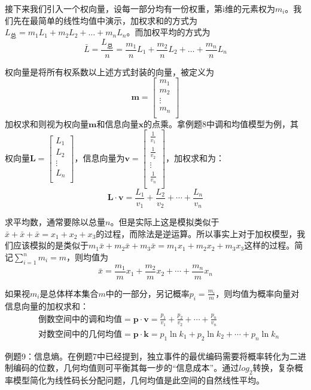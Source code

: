 \documentclass[fontset=none]{ctexart}
\begin{document}
接下来我们引入一个权向量，设每一部分均有一份权重，第i维的元素权为$m_i$。我们先在最简单的线性均值中演示，加权求和的方式为$L_\text{总}=m_1L_1+m_2L_2+\dots +m_nL_n$。而加权平均的方式为$$\bar{L}=\frac{L_\text{总}}{n} = \frac{m_1}{n}L_1+\frac{m_2}{n}L_2+\dots+\frac{m_n}{n}L_n$$

权向量是将所有权系数以上述方式封装的向量，被定义为
$$
\boldsymbol{m}=\left[ \begin{array}{c}
	m_1\\
	m_2\\
	\vdots\\
	m_n\\
\end{array} \right]
$$ 加权求和则视为权向量$\boldsymbol{m}$和信息向量$\boldsymbol{x}$的点乘。拿例题8中调和均值模型为例，其权向量$\boldsymbol{L}=
\left[ \begin{array}{c}
	L_1\\
	L_2\\
	\vdots\\
	L_n\\
\end{array} \right]
$，信息向量为$\boldsymbol{v}
=\left[ \begin{array}{c}
	\frac{1}{v_1}\\
	\frac{1}{v_2}\\
	\vdots\\
	\frac{1}{v_n}\\
\end{array} \right]
$，加权求和为：$$\boldsymbol{L}\cdot \boldsymbol{v}=\frac{L_1}{v_1}+\frac{L_2}{v_2}+\cdots +\frac{L_n}{v_n}$$

求平均数，通常要除以总量$n$。但是实际上这是模拟类似于$\bar{x}+\bar{x}+\bar{x} = x_1 + x_2 + x_3$的过程，而除法是逆运算。所以事实上对于加权模型，我们应该模拟的是类似于$m_1\bar{x}+m_2\bar{x}+m_3\bar{x} = m_1x_1 + m_2x_2 + m_3x_3$这样的过程。简记$\sum_{i=1}^n{m_i}= m$，则均值为$$\bar{x}=\frac{m_1}{m}x_1+\frac{m_2}{m}x_2+\cdots +\frac{m_n}{m}x_n$$

如果视$m_i$是总体样本集合$m$中的一部分，另记概率$p_i=\frac{m_i}{m}$，则均值为概率向量对信息向量的加权求和：
\begin{align}
  &\text{倒数空间中的调和均值}=\boldsymbol{p}\cdot \boldsymbol{v}=\frac{p_1}{v_1}+\frac{p_2}{v_2}+\cdots +\frac{p_n}{v_n} \\
  &\text{对数空间中的几何均值}=\boldsymbol{p}\cdot \boldsymbol{k}=p_1\ln k_1+p_2\ln k_2+\cdots +p_n\ln k_n
\end{align}

\lishu
例题9：信息熵。在例题7中已经提到，独立事件的最优编码需要将概率转化为二进制编码的位数，几何均值则可平衡其每一步的“信息成本”。通过$log_2$转换，复杂概率模型简化为线性码长分配问题，几何均值是此空间的自然线性平均。
\end{document}
